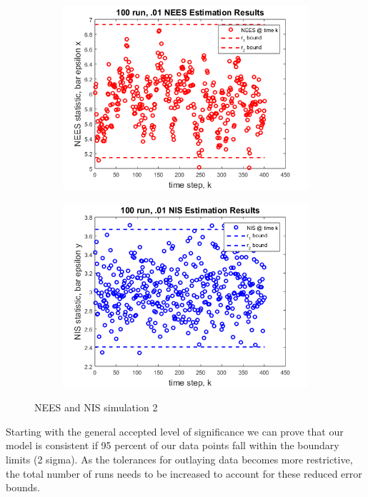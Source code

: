 \documentclass[12pt]{extarticle}
\begin{document}
{{\begin{figure}[h!]
    \begin{subfigure}[b]{0.49\textwidth}
        \centering
        \includegraphics[width=\textwidth]{Images/100NEES.png}
    \end{subfigure}
    \begin{subfigure}[b]{0.49\textwidth}
        \centering
        \includegraphics[width=\textwidth]{Images/100NIS.png}
    \end{subfigure}
    \caption{NEES and NIS simulation 2}
    \label{nissim2}
\end{figure}

Starting with the general accepted level of significance we can prove that our model is consistent if 95 percent of our data points fall within the boundary limits (2 sigma).  As the tolerances for outlaying data becomes more restrictive, the total number of runs needs to be increased to account for these reduced error bounds. 

}}
\end{document}
